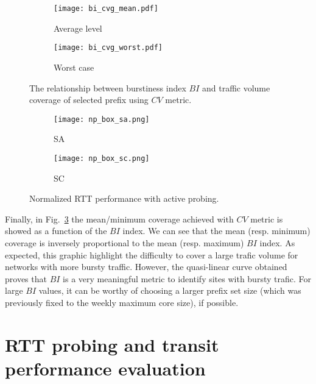 \documentclass[10pt, conference,letterpaper]{IEEEtran}
\begin{document}
\begin{figure}[!tb]
\centering
		\centering
        \begin{subfigure}[b]{0.21\textwidth}
        \centering
                \texttt{[image: bi\_cvg\_mean.pdf]}
                \caption{Average level}
                \label{fig:bi_cvg_mean}
        \end{subfigure}
        \hfill
        \begin{subfigure}[b]{0.27\textwidth}
                \texttt{[image: bi\_cvg\_worst.pdf]}
                \caption{Worst case}
                \label{fig:bi_cvg_worst}
        \end{subfigure}
\caption{The relationship between burstiness index $BI$ and traffic volume coverage of selected prefix using $CV$ metric.}
\label{fig:bi_cvg}
\end{figure}

\begin{figure*}[!tb]
\centering
		\centering
        \begin{subfigure}[b]{0.49\textwidth}
        \centering
                \texttt{[image: np\_box\_sa.png]}
                \caption{SA}
                \label{fig:np_sa}
        \end{subfigure}
        \hfill
        \begin{subfigure}[b]{0.49\textwidth}
        \centering
                \texttt{[image: np\_box\_sc.png]}
                \caption{SC}
                \label{fig:np_sc}
        \end{subfigure}

\caption{Normalized RTT performance with active probing.} \label{fig:np}
\end{figure*}


Finally, in Fig.~\ref{fig:bi_cvg} the mean/minimum coverage achieved with $CV$ metric is showed as a function of the $BI$ index. We can see that the mean (resp. minimum) coverage is inversely proportional to the mean (resp. maximum) $BI$ index. As expected, this graphic highlight the difficulty to cover a large trafic volume for networks with more bursty traffic. However, the quasi-linear curve obtained proves that $BI$ is a very meaningful metric to identify sites with bursty trafic. For large $BI$ values, it can be worthy of choosing a larger prefix set size (which was previously fixed to the weekly maximum core size), if possible. 


\section{RTT probing and transit performance evaluation}
\label{sec:rtt}
\end{document}
